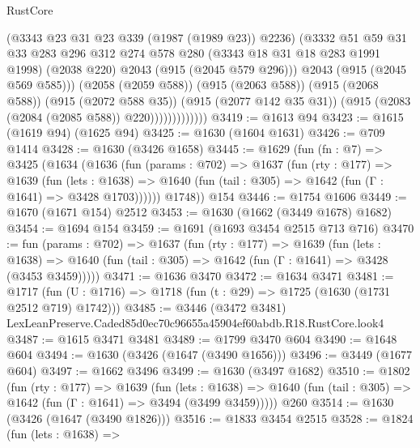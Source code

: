\begin{lexlean}{RustCore}
\begin{coremodule}
                            (@3343 @23 @31 @23 @339 (@1987 (@1989 @23)) @2236)
                            (@3332
                              @51
                              @59
                              @31
                              @33
                              @283
                              @296
                              @312
                              @274
                              @578
                              @280
                              (@3343 @18 @31 @18 @283 @1991 @1998)
                              (@2038 @220)
                              @2043
                              (@915 (@2045 @579 @296)))
                            @2043
                            (@915 (@2045 @569 @585)))
                          (@2058 (@2059 @588))
                          (@915 (@2063 @588))
                          (@915 (@2068 @588))
                          (@915 (@2072 @588 @35))
                          (@915 (@2077 @142 @35 @31))
                          (@915 (@2083 (@2084 (@2085 @588)) @220)))))))))))))
@3419 := @1613 @94
@3423 := @1615 (@1619 @94) (@1625 @94)
@3425 := @1630 (@1604 @1631)
@3426 := @709 @1414
@3428 := @1630 (@3426 @1658)
@3445 := @1629
    (fun (fn : @7) =>
    @3425
      (@1634
        (@1636
          (fun (params : @702) =>
          @1637
            (fun (rty : @177) =>
            @1639
              (fun (lets : @1638) =>
              @1640 (fun (tail : @305) => @1642 (fun (Γ : @1641) => @3428 @1703))))))
        @1748))
    @154
@3446 := @1754 @1606
@3449 := @1670 (@1671 @154) @2512
@3453 := @1630 (@1662 (@3449 @1678) @1682)
@3454 := @1694 @154
@3459 := @1691 (@1693 @3454 @2515 @713 @716)
@3470 := fun (params : @702) =>
  @1637
    (fun (rty : @177) =>
    @1639
      (fun (lets : @1638) =>
      @1640 (fun (tail : @305) => @1642 (fun (Γ : @1641) => @3428 (@3453 @3459)))))
@3471 := @1636 @3470
@3472 := @1634 @3471
@3481 := @1717 (fun (U : @1716) => @1718 (fun (t : @29) => @1725 (@1630 (@1731 @2512 @719) @1742)))
@3485 := @3446 (@3472 @3481) LexLeanPreserve.Caded85d0ec70c96655a45904ef60abdb.R18.RustCore.look4
@3487 := @1615 @3471 @3481
@3489 := @1799 @3470 @604
@3490 := @1648 @604
@3494 := @1630 (@3426 (@1647 (@3490 @1656)))
@3496 := @3449 (@1677 @604)
@3497 := @1662 @3496
@3499 := @1630 (@3497 @1682)
@3510 := @1802
    (fun (rty : @177) =>
    @1639
      (fun (lets : @1638) =>
      @1640 (fun (tail : @305) => @1642 (fun (Γ : @1641) => @3494 (@3499 @3459)))))
    @260
@3514 := @1630 (@3426 (@1647 (@3490 @1826)))
@3516 := @1833 @3454 @2515
@3528 := @1824
    (fun (lets : @1638) =>

\end{coremodule}
\end{lexlean}
